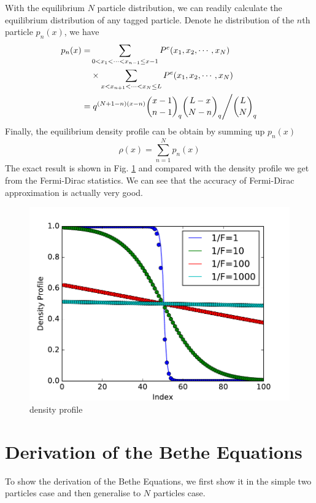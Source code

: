 \documentclass[aps,showpacs,twocolumn,floatfix,prx,superscriptaddress]{revtex4-1}
\begin{document}
With the equilibrium $N$ particle distribution, we can readily calculate the equilibrium distribution of any tagged particle. Denote he distribution of the $n$th particle $p_n(x)$, we have
\begin{equation}
    \begin{aligned}
        \label{eq:pdfTaggedParticle}
        p_n(x) = & \sum_{0<x_1<\cdots<x_{n-1}\le x-1}P^e(x_1, x_2, \cdots, x_N) \\
        &\times \sum_{x<x_{n+1}<\cdots<x_{N}\le L}P^e(x_1, x_2, \cdots, x_N) \\
        = & \left. q^{(N+1-n)(x-n)} \binom{x-1}{n-1}_q\binom{L-x}{N-n}_q 
            \middle/  \binom{L}{N}_q \right.
    \end{aligned}
\end{equation}
Finally, the equilibrium density profile can be obtain by summing up $p_n(x)$
\begin{equation}
    \label{eq:densityProfile}
    \rho(x) = \sum_{n=1}^N p_n(x) 
\end{equation}
The exact result is shown in Fig. \ref{fig:densityN100} and compared with the density profile we get from the Fermi-Dirac statistics. We can see that the accuracy of Fermi-Dirac approximation is actually very good.
\begin{figure}[htpb]
    \centering
    \includegraphics[width=1.0\linewidth]{densityN100}
    \caption{density profile}
    \label{fig:densityN100}
\end{figure}


\section{Derivation of the Bethe Equations}
\label{sec:derivation_of_bethe_equations}
To show the derivation of the Bethe Equations, we first show it in the simple two particles case and then generalise to $N$ particles case.
\end{document}
